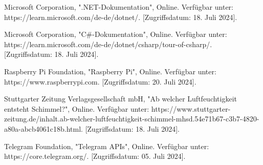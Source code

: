 \documentclass[conference]{IEEEtran}
\begin{document}
\begin{thebibliography}{00}
Microsoft Corporation, ".NET-Dokumentation", Online. Verfügbar unter: https://learn.microsoft.com/de-de/dotnet/. [Zugriffsdatum: 18. Juli 2024].

Microsoft Corporation, "C\#-Dokumentation", Online. Verfügbar unter: https://learn.microsoft.com/de-de/dotnet/csharp/tour-of-csharp/. [Zugriffsdatum: 18. Juli 2024].

Raspberry Pi Foundation, "Raspberry Pi", Online. Verfügbar unter: https://www.raspberrypi.com. [Zugriffsdatum: 20. Juli 2024].

Stuttgarter Zeitung Verlagsgesellschaft mbH, "Ab welcher Luftfeuchtigkeit entsteht Schimmel?", Online. Verfügbar unter: https://www.stuttgarter-zeitung.de/inhalt.ab-welcher-luftfeuchtigkeit-schimmel-mhsd.54e71b67-c3b7-4820-a80a-abcb4061c18b.html. [Zugriffsdatum: 18. Juli 2024].

Telegram Foundation, "Telegram APIs", Online. Verfügbar unter: https://core.telegram.org/. [Zugriffsdatum: 05. Juli 2024].

\end{thebibliography}
\clearpage
\end{document}
